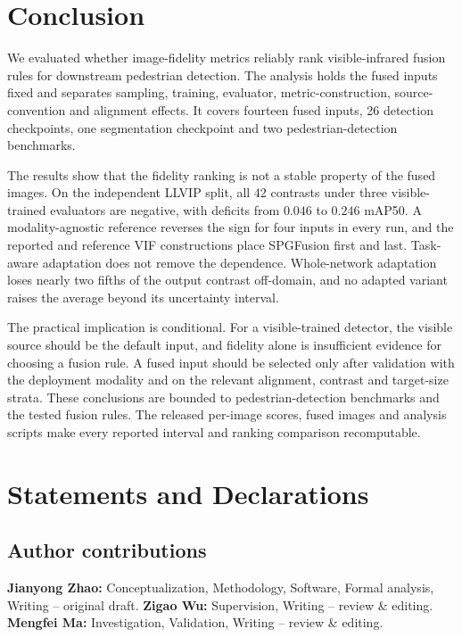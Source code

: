 \documentclass[10pt,a4paper]{article}
\begin{document}
\section{Conclusion}
\label{sec:conclusion}

\begin{sloppypar}
We evaluated whether image-fidelity metrics reliably rank visible-infrared fusion rules
for downstream pedestrian detection. The analysis holds the fused inputs fixed and
separates sampling, training, evaluator, metric-construction, source-convention and
alignment effects. It covers fourteen fused inputs, 26 detection checkpoints, one
segmentation checkpoint and two pedestrian-detection benchmarks.

The results show that the fidelity ranking is not a stable property of the fused images.
On the independent LLVIP split, all 42 contrasts under three visible-trained evaluators
are negative, with deficits from $0.046$ to $0.246$ mAP50. A modality-agnostic reference
reverses the sign for four inputs in every run, and the reported and reference VIF
constructions place SPGFusion first and last. Task-aware adaptation does not remove the
dependence. Whole-network adaptation loses nearly two fifths of the output contrast
off-domain, and no adapted variant raises the average beyond its uncertainty interval.

The practical implication is conditional. For a visible-trained detector, the visible
source should be the default input, and fidelity alone is insufficient evidence for
choosing a fusion rule. A fused input should be selected only after validation with the
deployment modality and on the relevant alignment, contrast and target-size strata.
These conclusions are bounded to pedestrian-detection benchmarks and the tested fusion
rules. The released per-image scores, fused images and analysis scripts make every
reported interval and ranking comparison recomputable.
\end{sloppypar}

\section*{Statements and Declarations}
\subsection*{Author contributions}
\textbf{Jianyong Zhao:} Conceptualization, Methodology, Software, Formal analysis,
Writing -- original draft. \textbf{Zigao Wu:} Supervision, Writing -- review \&
editing. \textbf{Mengfei Ma:} Investigation, Validation, Writing -- review \&
editing.
\end{document}
